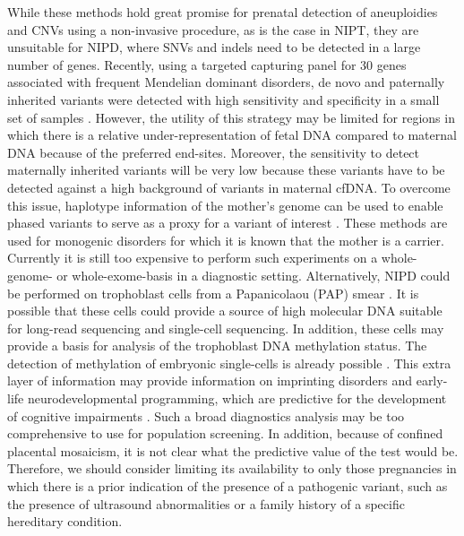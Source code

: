 While these methods hold great promise for prenatal detection of aneuploidies and CNVs using a non-invasive procedure, as is the case in NIPT, they are unsuitable for NIPD, where SNVs and indels need to be detected in a large number of genes. Recently, using a targeted capturing panel for 30 genes associated with frequent Mendelian dominant disorders, de novo and paternally inherited variants were detected with high sensitivity and specificity in a small set of samples \cite{Zhang_2019}. 
However, the utility of this strategy may be limited for regions in which there is a relative under-representation of fetal DNA compared to maternal DNA because of the preferred end-sites.
Moreover, the sensitivity to detect maternally inherited variants will be very low because these variants have to be detected against a high background of variants in maternal cfDNA. 
To overcome this issue, haplotype information of the mother’s genome can be used to enable phased variants to serve as a proxy for a variant of interest \cite{Vermeulen_2017,Jang_2018}. 
These methods are used for monogenic disorders for which it is known that the mother is a carrier. 
Currently it is still too expensive to perform such experiments on a whole-genome- or whole-exome-basis in a diagnostic setting. 
Alternatively, NIPD could be performed on trophoblast cells from a Papanicolaou (PAP) smear \cite{Jain_2016}. 
It is possible that these cells could provide a source of high molecular DNA suitable for long-read sequencing and single-cell sequencing. 
In addition, these cells may provide a basis for analysis of the trophoblast DNA methylation status. 
The detection of methylation of embryonic single-cells is already possible \cite{Zhu_2017}. 
This extra layer of information may provide information on imprinting disorders and early-life neurodevelopmental programming, which are predictive for the development of cognitive impairments \cite{Kotzot_2007,Tilley_2018}. 
Such a broad diagnostics analysis may be too comprehensive to use for population screening. 
In addition, because of confined placental mosaicism, it is not clear what the predictive value of the test would be. 
Therefore, we should consider limiting its availability to only those pregnancies in which there is a prior indication of the presence of a pathogenic variant, such as the presence of ultrasound abnormalities or a family history of a specific hereditary condition. 

